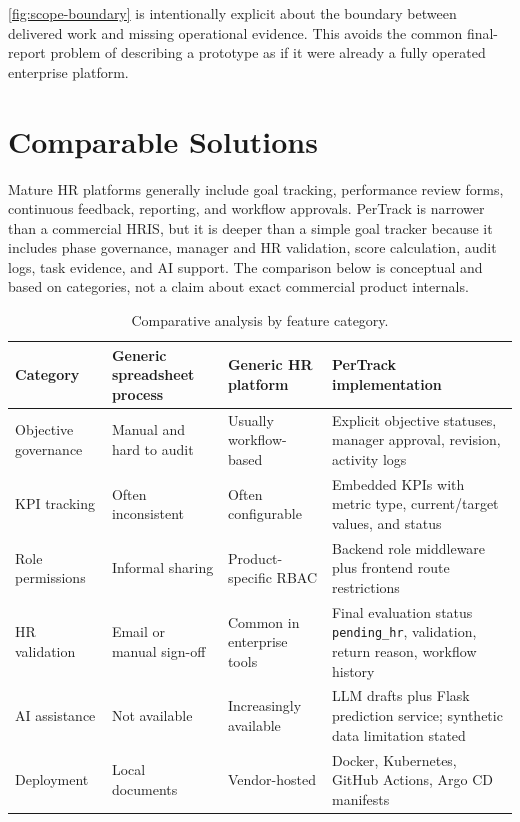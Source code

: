 

\cref{fig:scope-boundary} is intentionally explicit about the boundary between delivered work and missing operational evidence. This avoids the common final-report problem of describing a prototype as if it were already a fully operated enterprise platform.

\section{Comparable Solutions}
Mature HR platforms generally include goal tracking, performance review forms, continuous feedback, reporting, and workflow approvals. PerTrack is narrower than a commercial HRIS, but it is deeper than a simple goal tracker because it includes phase governance, manager and HR validation, score calculation, audit logs, task evidence, and AI support. The comparison below is conceptual and based on categories, not a claim about exact commercial product internals.

\begin{table}[H]\centering\small
\caption{Comparative analysis by feature category.}
\label{tab:comparative-analysis}
\begin{tabularx}{\textwidth}{p{}YYY}
\toprule
Category & Generic spreadsheet process & Generic HR platform & PerTrack implementation\\
\midrule
Objective governance & Manual and hard to audit & Usually workflow-based & Explicit objective statuses, manager approval, revision, activity logs\\
KPI tracking & Often inconsistent & Often configurable & Embedded KPIs with metric type, current/target values, and status\\
Role permissions & Informal sharing & Product-specific RBAC & Backend role middleware plus frontend route restrictions\\
HR validation & Email or manual sign-off & Common in enterprise tools & Final evaluation status \texttt{pending\_hr}, validation, return reason, workflow history\\
AI assistance & Not available & Increasingly available & LLM drafts plus Flask prediction service; synthetic data limitation stated\\
Deployment & Local documents & Vendor-hosted & Docker, Kubernetes, GitHub Actions, Argo CD manifests\\
\bottomrule
\end{tabularx}
\end{table}

